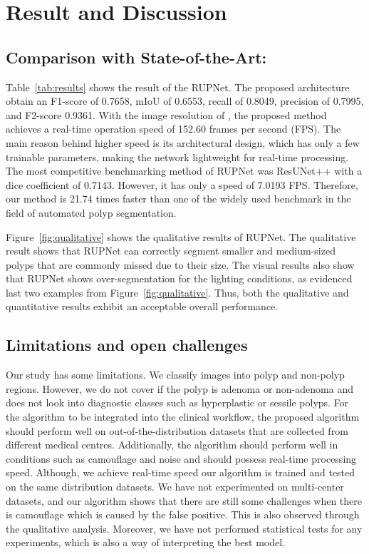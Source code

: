 \documentclass{article}
\begin{document}
\section{Result and Discussion}
\label{sec:results}
\subsection{Comparison with State-of-the-Art: } 
Table~\ref{tab:results} shows the result of the RUPNet. The proposed architecture obtain an F1-score of 0.7658, mIoU of 0.6553,  recall of 0.8049, precision of 0.7995, and F2-score 0.9361. With the image resolution of , the proposed method achieves a real-time operation speed of 152.60 frames per second (FPS). The main reason behind higher speed is its architectural design, which has only a few trainable parameters, making the network lightweight for real-time processing. The most competitive benchmarking method of RUPNet was ResUNet++ with a dice coefficient of 0.7143. However, it has only a speed of 7.0193 FPS. Therefore, our method is 21.74 times faster than one of the widely used benchmark in the field of automated polyp segmentation.


Figure~\ref{fig:qualitative} shows the qualitative results of RUPNet. The qualitative result shows that RUPNet can correctly segment smaller and medium-sized polyps that are commonly missed due to their size. The visual results also show that RUPNet shows over-segmentation for the lighting conditions, as evidenced last two examples from Figure~\ref{fig:qualitative}. Thus, both the qualitative and quantitative results exhibit an acceptable overall performance. 

\subsection{Limitations and open challenges}
Our study has some limitations. We classify images into polyp and non-polyp regions. However, we do not cover if the polyp is adenoma or non-adenoma and does not look into diagnostic classes such as hyperplastic or sessile polyps. For the algorithm to be integrated into the clinical workflow,  the proposed algorithm should perform well on out-of-the-distribution datasets that are collected from different medical centres. Additionally, the algorithm should perform well in conditions such as camouflage and noise and should possess real-time processing speed. Although, we achieve real-time speed our algorithm is trained and tested on the same distribution datasets. We have not experimented on multi-center datasets, and our algorithm shows that there are still some challenges when there is camouflage which is caused by the false positive. This is also observed through the qualitative analysis. Moreover, we have not performed statistical tests for any experiments, which is also a way of interpreting the best model. 
\end{document}
